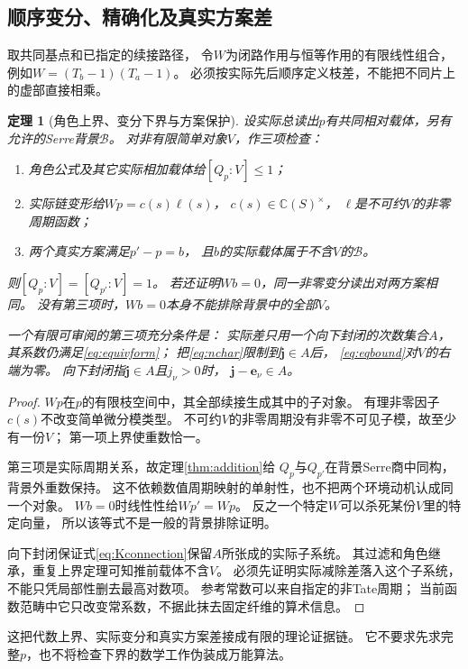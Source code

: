 \documentclass[11pt,a4paper]{ctexart}
\theoremstyle{cnplain}\newtheorem{theorem}{定理}[section]
\theoremstyle{definition}\newtheorem{definition}[theorem]{定义}
\theoremstyle{remark}\newtheorem{remark}[theorem]{注}
\begin{document}
\subsection{顺序变分、精确化及真实方案差}
取共同基点和已指定的续接路径，
令$W$为闭路作用与恒等作用的有限线性组合，
例如$W=(T_b-1)(T_a-1)$。
必须按实际先后顺序定义枝差，不能把不同片上的虚部直接相乘。

\begin{theorem}[角色上界、变分下界与方案保护]\label{thm:eqsandwich}
设实际总读出$p$有共同相对载体，另有允许的Serre背景$\mathcal B$。
对非有限简单对象$V$，作三项检查：
\begin{enumerate}
 \item 角色公式及其它实际相加载体给$[Q_p:V]\le1$；
 \item 实际链变形给$Wp=c(s)\ell(s)$，
       $c(s)\in\mathbb C(S)^\times$，
       $\ell$是不可约$V$的非零周期函数；
 \item 两个真实方案满足$p'-p=b$，
       且$b$的实际载体属于不含$V$的$\mathcal B$。
\end{enumerate}
则$[Q_p:V]=[Q_{p'}:V]=1$。
若还证明$Wb=0$，同一非零变分读出对两方案相同。
没有第三项时，$Wb=0$本身不能排除背景中的全部$V$。

一个有限可审阅的第三项充分条件是：
实际差只用一个向下封闭的次数集合$A$，
其系数仍满足\eqref{eq:equivform}；
把\eqref{eq:nchar}限制到$\mathbf j\in A$后，
\eqref{eq:eqbound}对$V$的右端为零。
向下封闭指$\mathbf j\in A$且$j_\nu>0$时，
$\mathbf j-\mathbf e_\nu\in A$。
\end{theorem}
\begin{proof}
$Wp$在$p$的有限枝空间中，其全部续接生成其中的子对象。
有理非零因子$c(s)$不改变简单微分模类型。
不可约$V$的非零周期没有非零不可见子模，故至少有一份$V$；
第一项上界使重数恰一。

第三项是实际周期关系，故定理\ref{thm:addition}给
$Q_p$与$Q_{p'}$在背景Serre商中同构，背景外重数保持。
这不依赖数值周期映射的单射性，也不把两个环境动机认成同一个对象。
$Wb=0$时线性性给$Wp'=Wp$。
反之一个特定$W$可以杀死某份$V$里的特定向量，
所以该等式不是一般的背景排除证明。

向下封闭保证式\eqref{eq:Kconnection}保留$A$所张成的实际子系统。
其过滤和角色继承，重复上界定理可知推前载体不含$V$。
必须先证明实际减除差落入这个子系统，
不能只凭局部性删去最高对数项。
参考常数可以来自指定的非Tate周期；
当前函数范畴中它只改变常系数，不据此抹去固定纤维的算术信息。
\end{proof}

这把代数上界、实际变分和真实方案差接成有限的理论证据链。
它不要求先求完整$p$，也不将检查下界的数学工作伪装成万能算法。
\end{document}
